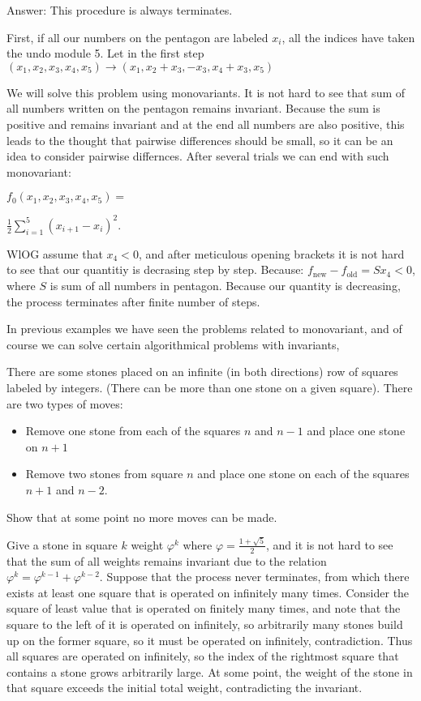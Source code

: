 \sol Answer: This procedure is always terminates.

First, if all our numbers on the pentagon are labeled $x_i$, all the indices have taken the undo module 5. Let in the first step $(x_1,x_2,x_3,x_4,x_5) \to (x_1,x_2+x_3,-x_3,x_4+x_3,x_5)$

We will solve this problem using monovariants. It is not hard to see that sum of all numbers written on the pentagon remains invariant. Because the sum is positive and remains invariant and at the end all numbers are also positive, this leads to the thought that pairwise differences should be small, so it can be an idea to consider pairwise differnces.  After several trials we can end with such monovariant:

$f_0(x_1,x_2,x_3,x_4,x_5)=$

$ \frac{1}{2} \sum_{i=1}^5 (x_{i+1}-x_i)^2$.

WlOG assume that $x_4<0$, and after meticulous opening brackets it is not hard to see that our quantitiy is decrasing step by step. Because: $f_{\text{new}}-f_{\text{old}}=Sx_4<0$, where $S$ is sum of all numbers in pentagon. Because our quantity is decreasing, the process terminates after finite number of steps.

In previous examples we have seen the problems related to monovariant, and of course we can solve certain algorithmical problems with invariants,

\begin{example}
    There are some stones placed on an infinite (in both directions) row of squares labeled by integers. (There can be more than one stone on a given square). There are two types of moves:
    \begin{itemize}
        \item Remove one stone from each of the squares $n$ and $n-1$ and place one stone on $n+1$
        \item Remove two stones from square $n$ and place one stone on each of the squares $n+1$ and $n-2$.
    \end{itemize}
    Show that at some point no more moves can be made.
\end{example}

\sol Give a stone in square $k$ weight $\varphi^k$ where $\varphi=\frac{1+\sqrt{5}}{2}$, and it is not hard to see that the sum of all weights remains invariant due to the relation $\varphi^k = \varphi^{k-1} + \varphi^{k-2}$. Suppose that the process never terminates, from which there exists at least one square that is operated on infinitely many times. Consider the square of least value that is operated on finitely many times, and note that the square to the left of it is operated on infinitely, so arbitrarily many stones build up on the former square, so it must be operated on infinitely, contradiction. Thus all squares are operated on infinitely, so the index of the rightmost square that contains a stone grows arbitrarily large. At some point, the weight of the stone in that square exceeds the initial total weight, contradicting the invariant.


